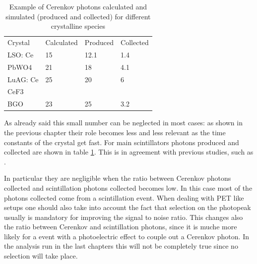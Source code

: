 \begin{table}[h]
\begin{center}
\begin{tabular}{llll}
Crystal  & Calculated & Produced & Collected \\
LSO: Ce  & 15         & 12.1     & 1.4       \\
PbWO4    & 21         & 18       & 4.1       \\
LuAG: Ce & 25         & 20       & 6         \\
CeF3     &            &          &           \\
BGO      & 23         & 25       & 3.2      
\end{tabular}
\end{center}
\caption[Cerenkov photons]{Example of Cerenkov photons calculated and simulated (produced and collected) for different crystalline species}
\label{table:cer}
\end{table}

As already said this small number can be neglected in most cases: as shown in the previous chapter their role becomes less and less relevant as the time constants of the crystal get fast. For main  scintillators photons produced and collected are shown in table \ref{table:cer}. This is in agreement with previous studies, such as \cite{Brunner2014}.

In particular they are negligible when the ratio between Cerenkov photons collected and scintillation photons collected becomes low. In this case most of the photons collected come from a scintillation event.
When dealing with PET like setups one should also take into account the fact that selection on the photopeak usually is mandatory for improving the signal to noise ratio. This changes also the ratio between Cerenkov and scintillation photons, since it is muche more likely for a event with a photoelectric effect to couple out a Cerenkov photon. In the analysis run in the last chapters this will not be completely true since no selection will take place.

